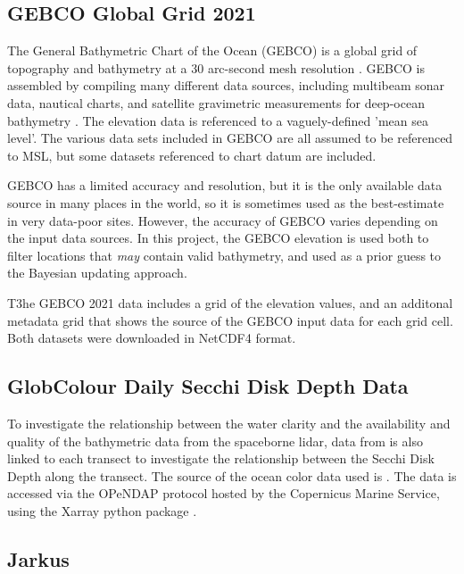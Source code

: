 \subsection{GEBCO Global Grid 2021}

The General Bathymetric Chart of the Ocean (GEBCO) is a global grid of topography and bathymetry at a 30 arc-second mesh resolution \parencite{gebco2021griddata}. GEBCO is assembled by compiling many different data sources, including multibeam sonar data, nautical charts, and satellite gravimetric measurements for deep-ocean bathymetry \parencite{gebcocookbook}. The elevation data is referenced to a vaguely-defined 'mean sea level'. The various data sets included in GEBCO are all assumed to be referenced to MSL, but some datasets referenced to chart datum are included. 

GEBCO has a limited accuracy and resolution, but it is the only available data source in many places in the world, so it is sometimes used as the best-estimate in very data-poor sites. However, the accuracy of GEBCO varies depending on the input data sources. In this project, the GEBCO elevation is used both to filter locations that \emph{may} contain valid bathymetry, and used as a prior guess to the Bayesian updating approach. 


T3he GEBCO 2021 data includes a grid of the elevation values, and an additonal metadata grid that shows the source of the GEBCO input data for each grid cell. Both datasets were downloaded in NetCDF4 format.


\subsection{GlobColour Daily Secchi Disk Depth Data}

To investigate the relationship between the water clarity and the availability and quality of the bathymetric data from the spaceborne lidar, data from \citeauthor{Garnesson2019} is also linked to each transect to investigate the relationship between the Secchi Disk Depth along the transect. The source of the ocean color data used is \cite{Garnesson2019}. The data is accessed via the OPeNDAP protocol hosted by the Copernicus Marine Service, using the Xarray python package \parencite{hoyer_stephan_2022_6323468,hoyer2017xarray}.


\subsection{Jarkus}

